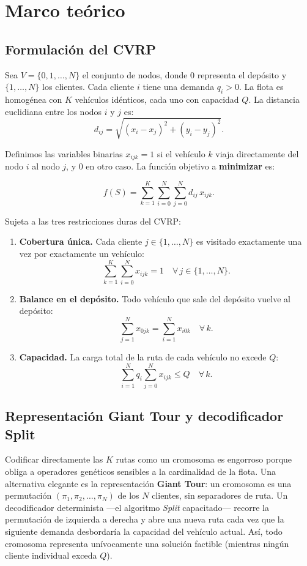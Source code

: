 \section{Marco teórico}
\label{sec:marco}

\subsection{Formulación del CVRP}

Sea $V = \{0, 1, \ldots, N\}$ el conjunto de nodos, donde $0$ representa el depósito y $\{1, \ldots, N\}$ los clientes. Cada cliente $i$ tiene una demanda $q_i > 0$. La flota es homogénea con $K$ vehículos idénticos, cada uno con capacidad $Q$. La distancia euclidiana entre los nodos $i$ y $j$ es:
$$d_{ij} = \sqrt{(x_i - x_j)^2 + (y_i - y_j)^2}.$$

Definimos las variables binarias $x_{ijk} = 1$ si el vehículo $k$ viaja directamente del nodo $i$ al nodo $j$, y $0$ en otro caso. La función objetivo a \textbf{minimizar} es:

\begin{equation}
\label{eq:cvrp}
f(S) = \sum_{k=1}^{K} \sum_{i=0}^{N} \sum_{j=0}^{N} d_{ij}\, x_{ijk}.
\end{equation}

Sujeta a las tres restricciones duras del CVRP:

\begin{enumerate}
    \item \textbf{Cobertura única.} Cada cliente $j \in \{1, \ldots, N\}$ es visitado exactamente una vez por exactamente un vehículo:
    $$\sum_{k=1}^{K} \sum_{i=0}^{N} x_{ijk} = 1 \quad \forall\, j \in \{1, \ldots, N\}.$$
    \item \textbf{Balance en el depósito.} Todo vehículo que sale del depósito vuelve al depósito:
    $$\sum_{j=1}^{N} x_{0jk} = \sum_{i=1}^{N} x_{i0k} \quad \forall\, k.$$
    \item \textbf{Capacidad.} La carga total de la ruta de cada vehículo no excede $Q$:
    $$\sum_{i=1}^{N} q_i \sum_{j=0}^{N} x_{ijk} \leq Q \quad \forall\, k.$$
\end{enumerate}

\subsection{Representación Giant Tour y decodificador Split}

Codificar directamente las $K$ rutas como un cromosoma es engorroso porque obliga a operadores genéticos sensibles a la cardinalidad de la flota. Una alternativa elegante es la representación \textbf{Giant Tour}: un cromosoma es una permutación $(\pi_1, \pi_2, \ldots, \pi_N)$ de los $N$ clientes, sin separadores de ruta. Un decodificador determinista —el algoritmo \emph{Split} capacitado— recorre la permutación de izquierda a derecha y abre una nueva ruta cada vez que la siguiente demanda desbordaría la capacidad del vehículo actual. Así, todo cromosoma representa unívocamente una solución factible (mientras ningún cliente individual exceda $Q$).

